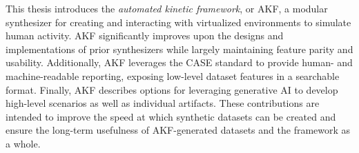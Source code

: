 This thesis introduces the \emph{\emph{automated kinetic framework}}, or
AKF, a modular synthesizer for creating and interacting with virtualized
environments to simulate human activity. AKF significantly improves upon
the designs and implementations of prior synthesizers while largely
maintaining feature parity and usability. Additionally, AKF leverages
the CASE standard to provide human- and machine-readable reporting,
exposing low-level dataset features in a searchable format. Finally, AKF
describes options for leveraging generative AI to develop high-level
scenarios as well as individual artifacts. These contributions are
intended to improve the speed at which synthetic datasets can be created
and ensure the long-term usefulness of AKF-generated datasets and the
framework as a whole.
